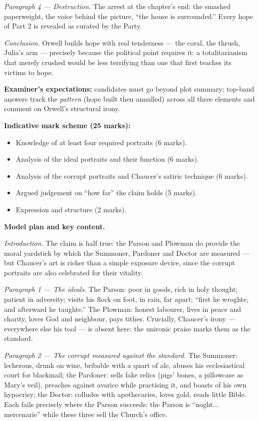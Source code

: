 \documentclass[11pt]{article}
\begin{document}
\begin{corrige}
\emph{Paragraph 4 --- Destruction.} The arrest at the chapter's end: the smashed paperweight, the voice behind the picture, ``the house is surrounded.'' Every hope of Part 2 is revealed as curated by the Party.

\emph{Conclusion.} Orwell builds hope with real tenderness --- the coral, the thrush, Julia's arm --- precisely because the political point requires it: a totalitarianism that merely crushed would be less terrifying than one that first teaches its victims to hope.

\textbf{Examiner's expectations:} candidates must go beyond plot summary; top-band answers track the \emph{pattern} (hope built then annulled) across all three elements and comment on Orwell's structural irony.
\end{corrige}

\begin{corrige}
\textbf{Indicative mark scheme (25 marks):}
\begin{itemize}
\item Knowledge of at least four required portraits (6 marks).
\item Analysis of the ideal portraits and their function (6 marks).
\item Analysis of the corrupt portraits and Chaucer's satiric technique (6 marks).
\item Argued judgement on ``how far'' the claim holds (5 marks).
\item Expression and structure (2 marks).
\end{itemize}

\textbf{Model plan and key content.}

\emph{Introduction.} The claim is half true: the Parson and Plowman do provide the moral yardstick by which the Summoner, Pardoner and Doctor are measured --- but Chaucer's art is richer than a simple exposure device, since the corrupt portraits are also celebrated for their vitality.

\emph{Paragraph 1 --- The ideals.} The Parson: poor in goods, rich in holy thought; patient in adversity; visits his flock on foot, in rain, far apart; ``first he wroghte, and afterward he taughte.'' The Plowman: honest labourer, lives in peace and charity, loves God and neighbour, pays tithes. Crucially, Chaucer's irony --- everywhere else his tool --- is absent here: the unironic praise marks them as the standard.

\emph{Paragraph 2 --- The corrupt measured against the standard.} The Summoner: lecherous, drunk on wine, bribable with a quart of ale, abuses his ecclesiastical court for blackmail; the Pardoner: sells fake relics (pigs' bones, a pillowcase as Mary's veil), preaches against avarice while practising it, and boasts of his own hypocrisy; the Doctor: colludes with apothecaries, loves gold, reads little Bible. Each fails precisely where the Parson succeeds: the Parson is ``noght... mercenarie'' while these three sell the Church's office.


\end{corrige}
\end{document}

